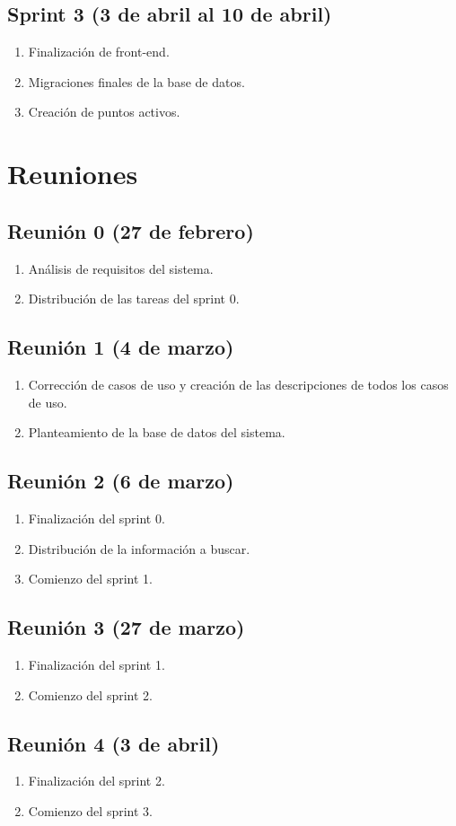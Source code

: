 \documentclass[12pt,letterpaper]{article}
\begin{document}
\subsection{Sprint 3 (3 de abril al 10 de abril)}
\begin{enumerate}
	\item Finalización de front-end.
	\item Migraciones finales de la base de datos.
	\item Creación de puntos activos.
\end{enumerate}


\section{Reuniones}
\subsection{Reunión 0 (27 de febrero)}
\begin{enumerate}
	\item Análisis de requisitos del sistema.
	\item Distribución de las tareas del sprint 0.
\end{enumerate}

\subsection{Reunión 1 (4 de marzo)}
\begin{enumerate}
	\item Corrección de casos de uso y creación de las descripciones de todos los casos de uso.
	\item Planteamiento de la base de datos del sistema.
\end{enumerate}

\subsection{Reunión 2 (6 de marzo)}
\begin{enumerate}
	\item Finalización del sprint 0.
	\item Distribución de la información a buscar.
	\item Comienzo del sprint 1.
\end{enumerate}

\subsection{Reunión 3 (27 de marzo)}
\begin{enumerate}
	\item Finalización del sprint 1.
	\item Comienzo del sprint 2.
\end{enumerate}

\subsection{Reunión 4 (3 de abril)}
\begin{enumerate}
	\item Finalización del sprint 2.
	\item Comienzo del sprint 3.
\end{enumerate}
\end{document}
